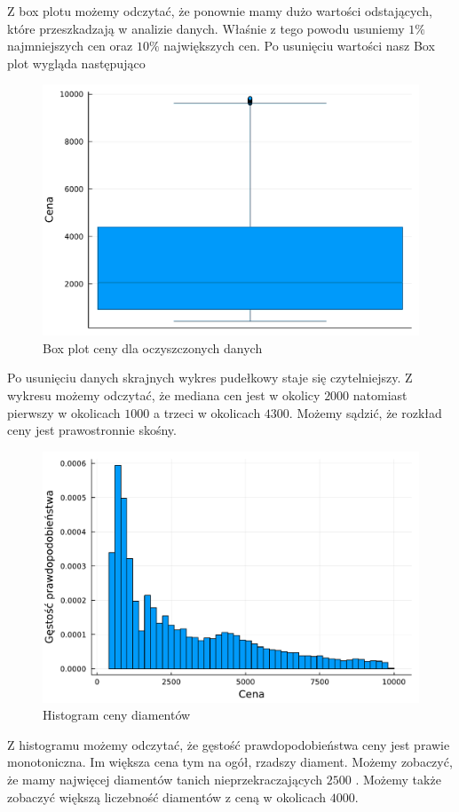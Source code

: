 \documentclass[12pt,leqno]{article}
\theoremstyle{exer}
\begin{document}
	Z box plotu możemy odczytać, że ponownie mamy dużo wartości odstających, które przeszkadzają w analizie danych. Właśnie z tego powodu usuniemy $ 1 \% $ najmniejszych cen oraz  $ 10\%$ największych cen.
	Po usunięciu wartości nasz Box plot wygląda następująco
	\begin{figure}[H]
		\centering
		\includegraphics[width=4\columnwidth/5]{images/boxplot_price_danych_oczyszczonych.pdf}
		\caption{Box plot ceny dla oczyszczonych danych}
		\label{fig:box_price}
	\end{figure}
	Po usunięciu danych skrajnych wykres pudełkowy staje się czytelniejszy. Z wykresu możemy odczytać, że mediana cen jest w okolicy $2000$ natomiast pierwszy w okolicach $1000$ a trzeci w okolicach $4300$. Możemy sądzić, że rozkład ceny jest prawostronnie skośny.
	
	\begin{figure}[H]
		\centering
		\includegraphics[width=4\columnwidth/5]{images/histogram_price.pdf}
		\caption{Histogram ceny diamentów}
		\label{fig:hist_price}
	\end{figure}
 Z histogramu możemy odczytać, że gęstość prawdopodobieństwa ceny jest prawie monotoniczna. Im większa cena tym na ogół, rzadszy diament. Możemy zobaczyć, że mamy najwięcej diamentów tanich nieprzekraczających $2500$ . Możemy także zobaczyć większą liczebność diamentów z ceną w okolicach $4000$. 
 
\end{document}
